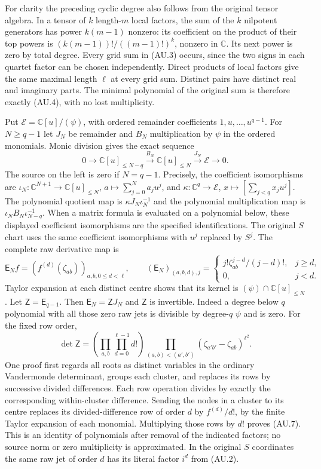 \documentclass[11pt]{article}
\newcommand{\C}{\mathbb C}
\begin{document}
For clarity the preceding cyclic degree also follows from the original
tensor algebra. In a tensor of $k$ length-$m$ local factors, the sum of
the $k$ nilpotent generators has power $k(m-1)$ nonzero: its coefficient
on the product of their top powers is $(k(m-1))!/((m-1)!)^k$, nonzero
in $\C$. Its next power is zero by total degree. Every grid sum in
(AU.3) occurs, since the two signs in each quartet factor can be chosen
independently. Direct products of local factors give the same maximal
length $\ell$ at every grid sum. Distinct pairs have distinct real and
imaginary parts. The minimal polynomial of the original sum is
therefore exactly (AU.4), with no lost multiplicity.

Put $\mathcal E=\C[u]/(\psi)$, with ordered remainder coefficients
$1,u,\ldots,u^{q-1}$. For $N\ge q-1$ let $J_N$ be remainder and
$B_N$ multiplication by $\psi$ in the ordered monomials. Monic division
gives the exact sequence
\[
 0\longrightarrow\C[u]_{\le N-q}
 \xrightarrow{B_N}\C[u]_{\le N}
 \xrightarrow{J_N}\mathcal E\longrightarrow0.              \tag{AU.5}
\]
The source on the left is zero if $N=q-1$.
Precisely, the coefficient isomorphisms are
$\iota_N:\C^{N+1}\to\C[u]_{\le N}$,
$a\mapsto\sum_{j=0}^Na_ju^j$, and
$\kappa:\C^q\to\mathcal E$, $x\mapsto[\sum_{j<q}x_ju^j]$.
The polynomial quotient map is $\kappa J_N\iota_N^{-1}$ and the
polynomial multiplication map is
$\iota_N B_N\iota_{N-q}^{-1}$. When a matrix formula is evaluated
on a polynomial below, these displayed coefficient isomorphisms are
the specified identifications. The original $S$ chart uses the same
coefficient isomorphisms with $u^j$ replaced by $S^j$.
The complete raw derivative map is
\[
 \mathsf E_N f=(f^{(d)}(\zeta_{ab}))_{a,b,0\le d<\ell},
 \qquad
 (\mathsf E_N)_{(a,b,d),j}=
 \begin{cases}j!\zeta_{ab}^{j-d}/(j-d)!,&j\ge d,\\0,&j<d.
 \end{cases}                                                \tag{AU.6}
\]
Taylor expansion at each distinct centre shows that its kernel is
$(\psi)\cap\C[u]_{\le N}$. Let $\mathsf Z=\mathsf E_{q-1}$.
Then $\mathsf E_N=\mathsf ZJ_N$ and $\mathsf Z$ is invertible.
Indeed a degree below $q$ polynomial with all those zero raw jets is
divisible by degree-$q$ $\psi$ and is zero. For the fixed row order,
\[
 \det\mathsf Z=
 \left(\prod_{a,b}\prod_{d=0}^{\ell-1}d!\right)
 \prod_{(a,b)<(a',b')}(\zeta_{a'b'}-\zeta_{ab})^{\ell^2}.
 \tag{AU.7}
\]
One proof first regards all roots as distinct variables in the ordinary
Vandermonde determinant, groups each cluster, and replaces its rows by
successive divided differences. Each row operation divides by exactly
the corresponding within-cluster difference. Sending the nodes in a
cluster to its centre replaces its divided-difference row of order $d$
by $f^{(d)}/d!$, by the finite Taylor expansion of each monomial.
Multiplying those rows by $d!$ proves (AU.7). This is an identity of
polynomials after removal of the indicated factors; no source norm or
zero multiplicity is approximated. In the original $S$ coordinates the
same raw jet of order $d$ has its literal factor $i^d$ from (AU.2).
\end{document}
